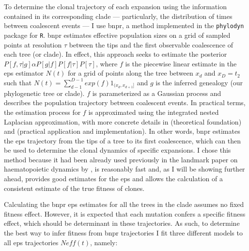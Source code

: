 To determine the clonal trajectory of each expansion using the information contained in its corresponding clade --- particularly, the distribution of times between coalescent events --- I use \ac{bnpr}, a method implemented in the \texttt{phylodyn} \cite{Lan2015-sw,Karcher2017-kt} package for \texttt{R}. \ac{bnpr} estimates effective population sizes on a grid of sampled points at resolution $\tau$ between the tips and the first observable coalescence of each tree (or clade). In effect, this approach seeks to estimate the posterior $P[f,\tau|g]\alpha P[g|f]P[f|\tau]P[\tau]$, where $f$ is the piecewise linear estimate in the \ac{eps} estimator $N(t)$ for a grid of points along the tree between $x_d$ and $x_D=t_2$ such that $N(t) = \sum^{D-1}_{d-1}exp(f)1_{(x_d,x_{d+1}]}$ and $g$ is the inferred genealogy (our phylogenetic tree or clade). $f$ is parameterized as a Gaussian process and describes the population trajectory between coalescent events. In practical terms, the estimation process for $f$ is approximated using the integrated nested Laplacian approximation, with more concrete details in \cite{Lan2015-sw} (theoretical foundation) and \cite{Karcher2017-kt} (practical application and implementation). In other words, \ac{bnpr} estimates the \ac{eps} trajectory from the tips of a tree to its first coalescence, which can then be used to determine the clonal dynamics of specific expansions. I chose this method because it had been already used previously in the landmark paper on haematopoietic dynamics by , is reasonably fast and, as I will be showing further ahead, provides good estimates for the \ac{eps} and allows the calculation of a consistent estimate of the true fitness of clones.

Calculating the \ac{bnpr} \ac{eps} estimates for all the trees in the clade assumes no fixed fitness effect. However, it is expected that each mutation confers a specific fitness effect, which should be determinant in these trajectories. As such, to determine the best way to infer fitness from \ac{bnpr} trajectories I fit three different models to all \ac{eps} trajectories $Neff(t)$, namely:

